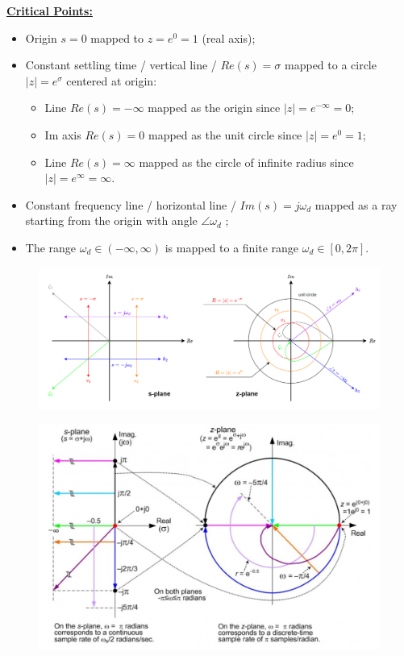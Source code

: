 \textbf{\underline{Critical Points:}}
\begin{itemize}
    \item Origin $s=0$ mapped to $z=e^0 = 1$ (real axis);
    \item Constant settling time / vertical line / $Re(s)=\sigma$ mapped to a circle $|z|=e^{\sigma}$ centered at origin:
    \begin{itemize}
        \item Line $Re(s)=-\infty$ mapped as the origin since $|z|=e^{-\infty}=0$;
        \item Im axis $Re(s)=0$ mapped as the unit circle since $|z|=e^0=1$;
        \item Line $Re(s)=\infty$ mapped as the circle of infinite radius since $|z|=e^{\infty}=\infty$.
    \end{itemize}
    \item Constant frequency line / horizontal line / $Im(s)=j\omega_d$ mapped as a ray starting from the origin with angle $\angle \omega_d$ ;
    \item The range $\omega_d \in (-\infty, \infty)$ is mapped to a finite range $\omega_d \in [0, 2\pi]$.
\end{itemize}

\begin{figure}[H]
    \centering
    \includegraphics[width=1.0\linewidth]{images/Mapping_sumary_1.png}
\end{figure}
\begin{figure}[H]
    \centering
    \includegraphics[width=1.0\linewidth]{images/Mapping_sumary_2.png}
\end{figure}

